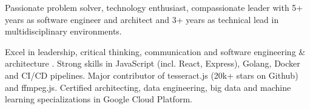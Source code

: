

\begin{cvparagraph}

Passionate problem solver, technology enthusiast, compassionate leader with 5+ years as software engineer and architect and 3+ years as technical lead in multidisciplinary environments.

Excel in leadership, critical thinking, communication and software engineering & architecture . Strong skills in JavaScript (incl. React, Express), Golang, Docker and CI/CD pipelines. Major contributor of tesseract.js (20k+ stars on Github) and ffmpeg.js. Certified architecting, data engineering, big data and machine learning specializations in Google Cloud Platform. 
\end{cvparagraph}
